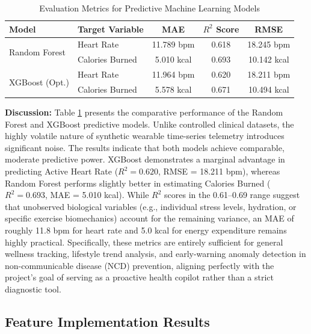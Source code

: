 \documentclass[journal, a4paper]{IEEEtran}
\begin{document}
\begin{table}[H]
\caption{Evaluation Metrics for Predictive Machine Learning Models}
\label{tab:ml_metrics}
\setlength{\tabcolsep}{3pt}
\begin{center}
\begin{tabular}{|l|l|c|c|c|}
\hline
\textbf{Model} & \textbf{Target Variable} & \textbf{MAE} & \textbf{$R^2$ Score} & \textbf{RMSE} \\
\hline
\multirow{2}{*}{Random Forest} & Heart Rate & 11.789 bpm & 0.618 & 18.245 bpm \\
\cline{2-5}
& Calories Burned & 5.010 kcal & 0.693 & 10.142 kcal \\
\hline
\multirow{2}{*}{XGBoost (Opt.)} & Heart Rate & 11.964 bpm & 0.620 & 18.211 bpm \\
\cline{2-5}
& Calories Burned & 5.578 kcal & 0.671 & 10.494 kcal \\
\hline
\end{tabular}
\end{center}
\end{table}

\textbf{Discussion:} Table \ref{tab:ml_metrics} presents the comparative performance of the Random Forest and XGBoost predictive models. Unlike controlled clinical datasets, the highly volatile nature of synthetic wearable time-series telemetry introduces significant noise. The results indicate that both models achieve comparable, moderate predictive power. XGBoost demonstrates a marginal advantage in predicting Active Heart Rate ($R^2 = 0.620$, RMSE = 18.211 bpm), whereas Random Forest performs slightly better in estimating Calories Burned ($R^2 = 0.693$, MAE = 5.010 kcal). While $R^2$ scores in the 0.61--0.69 range suggest that unobserved biological variables (e.g., individual stress levels, hydration, or specific exercise biomechanics) account for the remaining variance, an MAE of roughly 11.8 bpm for heart rate and 5.0 kcal for energy expenditure remains highly practical. Specifically, these metrics are entirely sufficient for general wellness tracking, lifestyle trend analysis, and early-warning anomaly detection in non-communicable disease (NCD) prevention, aligning perfectly with the project's goal of serving as a proactive health copilot rather than a strict diagnostic tool.

\subsection{Feature Implementation Results}
\end{document}
